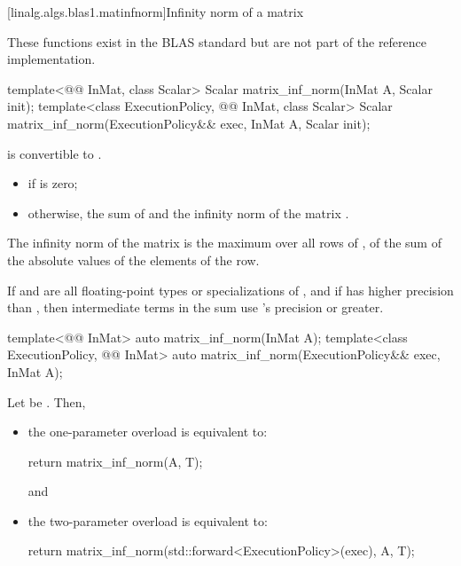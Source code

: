 [linalg.algs.blas1.matinfnorm]{Infinity norm of a matrix}

\pnum
\begin{note}
These functions exist in the BLAS standard but are not part of the reference implementation.
\end{note}

\begin{itemdecl}
template<@@ InMat, class Scalar>
  Scalar matrix_inf_norm(InMat A, Scalar init);
template<class ExecutionPolicy, @@ InMat, class Scalar>
  Scalar matrix_inf_norm(ExecutionPolicy&& exec, InMat A, Scalar init);
\end{itemdecl}

\begin{itemdescr}
\pnum
\mandates
{}
is convertible to .

\pnum
\returns
\begin{itemize}
\item
{} if  is zero;
\item
otherwise,
the sum of  and the infinity norm of the matrix .
\end{itemize}
\begin{note}
The infinity norm of the matrix 
is the maximum over all rows of ,
of the sum of the absolute values
of the elements of the row.
\end{note}

\pnum
\remarks
If  and 
are all floating-point types or specializations of ,
and if  has higher precision
than ,
then intermediate terms in the sum use 's precision or greater.
\end{itemdescr}

\begin{itemdecl}
template<@@ InMat>
  auto matrix_inf_norm(InMat A);
template<class ExecutionPolicy, @@ InMat>
  auto matrix_inf_norm(ExecutionPolicy&& exec, InMat A);
\end{itemdecl}

\begin{itemdescr}

\pnum
\effects
Let  be
.
Then,
\begin{itemize}
\item
the one-parameter overload is equivalent to:
\begin{codeblock}
return matrix_inf_norm(A, T{});
\end{codeblock}
and
\item
the two-parameter overload is equivalent to:
\begin{codeblock}
return matrix_inf_norm(std::forward<ExecutionPolicy>(exec), A, T{});
\end{codeblock}
\end{itemize}
\end{itemdescr}


